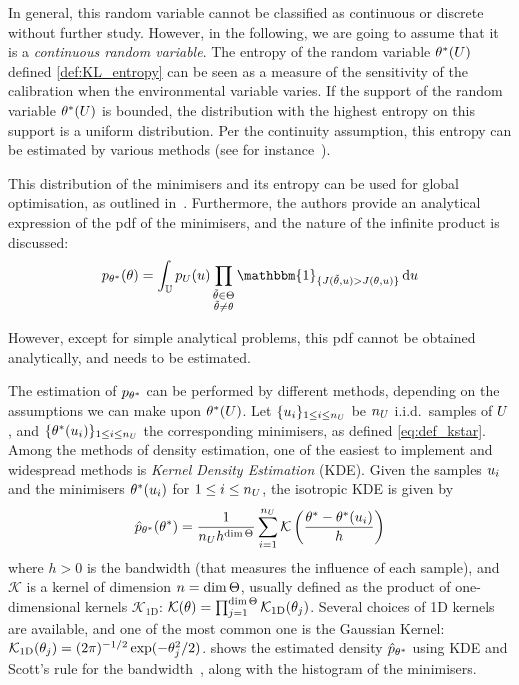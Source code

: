 \documentclass[../../Main_ManuscritThese.tex]{subfiles}
\begin{document}
In general, this random variable cannot be classified as continuous or
discrete without further study. However, in the following, we are
going to assume that it is a \emph{continuous random variable}.  The
entropy of the random variable $\theta^*(U)$ defined
\cref{def:KL_entropy} can be seen as a measure of the sensitivity of
the calibration when the environmental variable varies. If the support
of the random variable $\theta^*(U)$ is bounded, the distribution with
the highest entropy on this support is a uniform distribution.  Per
the continuity assumption, this entropy can be estimated by various
methods (see for instance~\cite{beirlant_nonparametric_1997}).


This distribution of the minimisers and its entropy can be used for
global optimisation, as outlined
in~\cite{hennig_entropy_2011}. Furthermore, the authors provide an
analytical expression of the pdf of the minimisers, and the nature of
the infinite product is discussed:
\begin{equation}
  p_{\KK^*}(\kk) = \int_{\Uspace} p_{\UU}(\uu)\prod_{\substack{\tilde{\kk}\in \Kspace\\\tilde{\kk}\neq \kk}} \mathbbm{1}_{\{J(\tilde{\kk},\uu) > J(\kk, \uu)\}}\,\mathrm{d}\uu
\end{equation}

However, except for simple analytical problems, this pdf cannot be
obtained analytically, and needs to be estimated.

The estimation of $p_{\theta^*}$ can be performed by different methods,
depending on the assumptions we can make upon $\theta^*(U)$. Let
$\{u_i\}_{1\leq i \leq n_{U}}$ be $n_{U}$ i.i.d.\ samples of
$U$, and $\{\theta^*(u_i)\}_{1\leq i \leq n_{U}}$ the corresponding
minimisers, as defined \cref{eq:def_kstar}. Among the methods of
density estimation, one of the easiest to implement and widespread
methods is \emph{Kernel Density Estimation} (KDE).  Given the samples
$u_i$ and the minimisers $\theta^*(u_i)$ for $1\leq i \leq n_{U}$,
the isotropic KDE is given by
\begin{equation}
  \hat{p}_{\theta^*}(\theta^*) = \frac{1}{n_{U} h^{\dim \Theta}} \sum_{i=1}^{n_{U}} \mathcal{K}\left(\frac{\theta^* - \theta^*(u_i)}{h}\right)
\end{equation}
where $h>0$ is the bandwidth (that measures the influence of each
sample), and $\mathcal{K}$ is a kernel of dimension $n=\dim \Theta$,
usually defined as the product of one-dimensional kernels
$\mathcal{K}_{1\mathrm{D}}$:
$\mathcal{K}(\theta) = \prod_{j=1}^{\dim
  \Theta}\mathcal{K}_{1\mathrm{D}}(\theta_j)$. Several choices of 1D
kernels are available, and one of the most common one is the Gaussian
Kernel:
$\mathcal{K}_{1\mathrm{D}}(\theta_j) = (2\pi)^{-1/2}\exp(-\theta_j^2
/2)$.  shows the estimated density
$\hat{p}_{\theta^*}$ using KDE and Scott's rule for the
bandwidth~\cite{scott_optimal_1979}, along with the histogram of the
minimisers.
\end{document}
